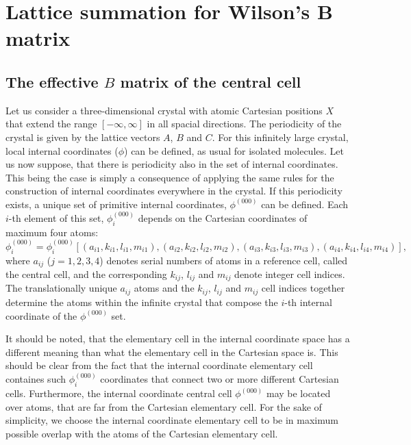 \documentclass[prl,aps,preprint,superbib,12pt]{revtex4}
\begin{document}
\section{Lattice summation for Wilson's B matrix}
\subsection{The effective $B$ matrix of the central cell}
Let us consider a three-dimensional crystal with atomic 
Cartesian positions $X$ that extend the range $[-\infty,\infty]$
in all spacial directions. The periodicity of the crystal
is given by the lattice vectors $A$, $B$ and $C$.
For this infinitely large crystal, local internal coordinates ($\phi$) 
can be defined, as usual for isolated molecules. Let us now suppose,
that there is periodicity also in the set of internal coordinates.
This being the case is simply a consequence of applying the 
same rules for the 
construction of internal coordinates everywhere in the crystal.
If this periodicity exists, a unique set of primitive internal 
coordinates, $\phi^{(000)}$ can be defined. Each $i$-th element of this
set, $\phi^{(000)}_{i}$ depends on the Cartesian coordinates of
maximum four atoms: 
\begin{equation}
\phi^{(000)}_{i}=\phi^{(000)}_{i}[
(a_{i1},k_{i1},l_{i1},m_{i1}),
(a_{i2},k_{i2},l_{i2},m_{i2}),
(a_{i3},k_{i3},l_{i3},m_{i3}),
(a_{i4},k_{i4},l_{i4},m_{i4})],
\end{equation}
where $a_{ij}$ ($j=1,2,3,4$) denotes serial numbers of atoms in 
a reference cell, called the 
central cell, and the corresponding $k_{ij}$, $l_{ij}$ and $m_{ij}$ 
denote integer cell indices.
The translationally unique $a_{ij}$ atoms and the 
$k_{ij}$, $l_{ij}$ and $m_{ij}$ 
cell indices together determine
the atoms within the infinite crystal that compose 
the $i$-th internal coordinate of the $\phi^{(000)}$ set. 

It should be noted, that the elementary cell in the
internal coordinate space has a different meaning than what 
the elementary cell in the Cartesian space is. This should
be clear from the fact that the internal coordinate elementary cell 
containes such $\phi^{(000)}_{i}$ coordinates that connect
two or more different Cartesian cells. Furthermore, the internal
coordinate central cell $\phi^{(000)}$ may be located over atoms, 
that are far
from the Cartesian elementary cell. For the sake of simplicity,
we choose the internal coordinate elementary cell to be in maximum
possible overlap with the atoms of the Cartesian elementary cell.
\end{document}
